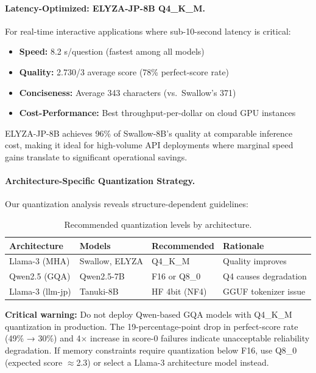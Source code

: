 \documentclass[twocolumn]{article}
\begin{document}
\paragraph{Latency-Optimized: ELYZA-JP-8B Q4\_K\_M.}
For real-time interactive applications where sub-10-second latency is critical:
\begin{itemize}
  \item \textbf{Speed:} 8.2 s/question (fastest among all models)
  \item \textbf{Quality:} 2.730/3 average score (78\% perfect-score rate)
  \item \textbf{Conciseness:} Average 343 characters (vs.\ Swallow's 371)
  \item \textbf{Cost-Performance:} Best throughput-per-dollar on cloud GPU instances
\end{itemize}

ELYZA-JP-8B achieves 96\% of Swallow-8B's quality at comparable inference cost,
making it ideal for high-volume API deployments where marginal speed gains translate
to significant operational savings.

\paragraph{Architecture-Specific Quantization Strategy.}
Our quantization analysis reveals structure-dependent guidelines:

\begin{table}[t]
\centering
\small
\caption{Recommended quantization levels by architecture.}
\label{tab:quant_recommendations}
\begin{tabular}{llll}
\toprule
\textbf{Architecture} & \textbf{Models} & \textbf{Recommended} & \textbf{Rationale} \\
\midrule
Llama-3 (MHA) & Swallow, ELYZA & Q4\_K\_M & Quality improves \\
Qwen2.5 (GQA) & Qwen2.5-7B & F16 or Q8\_0 & Q4 causes degradation \\
Llama-3 (llm-jp) & Tanuki-8B & HF 4bit (NF4) & GGUF tokenizer issue \\
\bottomrule
\end{tabular}
\end{table}

\textbf{Critical warning:} Do not deploy Qwen-based GQA models with Q4\_K\_M quantization
in production. The 19-percentage-point drop in perfect-score rate (49\% → 30\%) and
4$\times$ increase in score-0 failures indicate unacceptable reliability degradation.
If memory constraints require quantization below F16, use Q8\_0 (expected score $\approx$2.3)
or select a Llama-3 architecture model instead.
\end{document}
